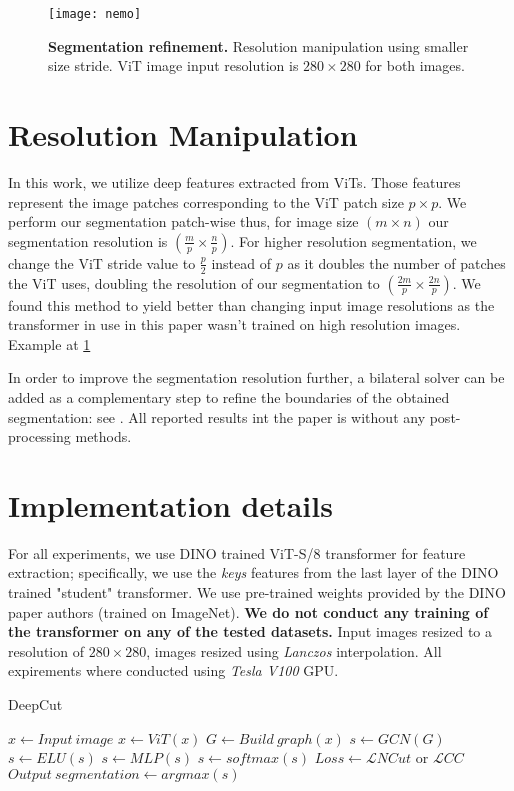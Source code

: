 \documentclass[10pt,twocolumn,letterpaper]{article}
\begin{document}
\begin{figure}[t]
\texttt{[image: nemo]}
\caption{
\textbf{Segmentation refinement.} Resolution manipulation using smaller size stride. ViT image input resolution is $280 \times 280$ for both images.
}
\label{fig:nemo}
 \end{figure}
 
\section{Resolution Manipulation}\label{res_man}
In this work, we utilize deep features extracted from ViTs. Those features represent the image patches corresponding to the ViT patch size $p \times p$.
We perform our segmentation patch-wise thus, for image size $(m\times n)$ our segmentation resolution is $(\frac{m}{p} \times \frac{n}{p})$. For higher resolution segmentation, we change the ViT stride value to $\frac{p}{2}$ instead of $p$ as it doubles the number of patches the ViT uses, doubling the resolution of our segmentation to 
$(\frac{2m}{p} \times \frac{2n}{p})$.
We found this method to yield better than changing input image resolutions as the transformer in use in this paper wasn't trained on high resolution images.
Example at \cref{fig:nemo}

In order to improve the segmentation resolution further, a bilateral solver\cite{barron2016fast} can be added as a complementary step to refine the boundaries of the obtained segmentation: see . All reported results int the paper is without any post-processing methods.

\section{Implementation details}
\label{sec:intro}
For all experiments, we use DINO \cite{caron2021emerging} trained ViT-S/8 transformer for feature extraction; specifically, we use the \emph{keys} features from the last layer of the DINO trained "student" transformer.  We use pre-trained weights provided by the DINO paper authors (trained on ImageNet\cite{ILSVRC15}).
 \textbf{We do not conduct any training of the transformer on any of the tested datasets.} Input images resized to a resolution of $280 \times 280$, images resized using \emph{Lanczos} interpolation. All expirements where conducted using \emph{Tesla V100} GPU.

\begin{algorithm}
\caption{DeepCut}\label{alg:cap}
\begin{algorithmic}[1]
\State $x \gets Input \ image$
\State $x \gets ViT(x)$ 
\State $G \gets Build \ graph(x)$
    \State $s \gets GCN(G)$ 
    \State $s \gets ELU(s)$
    \State $s \gets MLP(s)$ 
    \State $s \gets softmax(s)$
    \State $Loss \gets \mathcal{L}{NCut}$ or $\mathcal{L}{CC}$
\EndFor
\State $Output \ segmentation \gets argmax(s)$
\end{algorithmic}
\end{algorithm}
\end{document}
